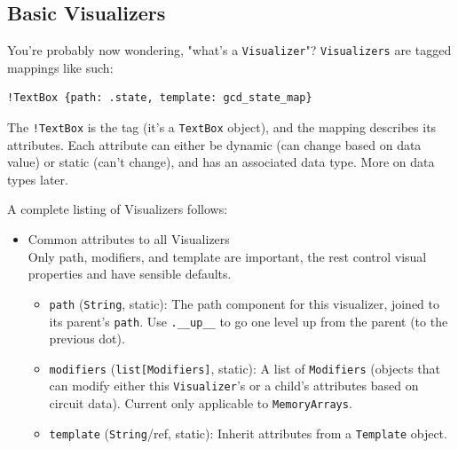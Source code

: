 \documentclass[11pt]{article}
\begin{document}
\subsection{Basic Visualizers}
You're probably now wondering, "what's a \texttt{Visualizer}"? \texttt{Visualizers} are tagged mappings like such:
\begin{verbatim}
!TextBox {path: .state, template: gcd_state_map}
\end{verbatim}
The \texttt{!TextBox} is the tag (it's a \texttt{TextBox} object), and the mapping describes its attributes. Each attribute can either be dynamic (can change based on data value) or static (can't change), and has an associated data type. More on data types later.

A complete listing of Visualizers follows:
\begin{itemize}
  \item Common attributes to all Visualizers \\
  Only path, modifiers, and template are important, the rest control visual properties and have sensible defaults.
  \begin{itemize}
    \item \texttt{path} (\texttt{String}, static): The path component for this visualizer, joined to its parent's \texttt{path}. Use \texttt{.\_\_up\_\_} to go one level up from the parent (to the previous dot).
    \item \texttt{modifiers} (\texttt{list[Modifiers]}, static): A list of \texttt{Modifiers} (objects that can modify either this \texttt{Visualizer}'s or a child's attributes based on circuit data). Current only applicable to \texttt{MemoryArrays}.
    \item \texttt{template} (\texttt{String}/ref, static): Inherit attributes from a \texttt{Template} object.
    

\end{itemize}
\end{itemize}
\end{document}
